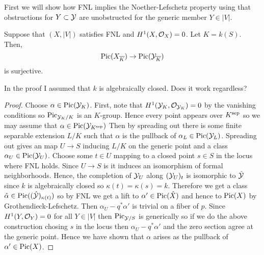 \documentclass[12pt]{article}
\begin{document}
First we will show how FNL implies the Noether-Lefschetz property using that obstructions for $Y \subset \mathcal{Y}$ are unobstructed for the generic member $Y \in |V|$.

\begin{theorem} \label{thm:FNL_implies_geometric_NL}
Suppose that $(X, |V|)$ satisfies FNL and $H^1(X, \mathcal{O}_{X}) = 0$. Let $K = k(S)$. Then,
\[ \mathrm{Pic}(X_{\overline{K}}) \to \mathrm{Pic}(\mathcal{Y}_{\overline{K}}) \]
is surjective.
\end{theorem}

{\color{red} In the proof I assumed that $k$ is algebraically closed. Does it work regardless?}

\begin{proof}
Choose $\alpha \in \mathrm{Pic}(\mathcal{Y}_K)$. First, note that $H^1(\mathcal{Y}_K, \mathcal{O}_{\mathcal{Y}_K}) = 0$ by the vanishing conditions so $\mathrm{Pic}_{\mathcal{Y}_K/K}$ is an \etale $K$-group. Hence every point appears over $K^{\mathrm{sep}}$ so we may assume that $\alpha \in \mathrm{Pic}(\mathcal{Y}_{K^{\mathrm{sep}}})$ Then by spreading out there is some finite separable extension $L/K$ such that $\alpha$ is the pullback of $\alpha_L \in \mathrm{Pic}(\mathcal{Y}_L)$. Spreading out gives an \etale map $U \to S$ inducing $L/K$ on the generic point and a class $\alpha_U \in \mathrm{Pic}(\mathcal{Y}_U)$. Choose some $t \in U$ mapping to a closed point $s \in S$ in the locus where FNL holds. Since $U \to S$ is \etale it induces an isomorphism of formal neighborhoods. Hence, the completion of $\mathcal{Y}_U$ along $(\mathcal{Y}_U)_t$ is isomorphic to $\hat{\mathcal{Y}}$ since $k$ is algebraically closed so $\kappa(t) = \kappa(s) = k$. Therefore we get a class $\hat{\alpha} \in \mathrm{Pic}((\hat{\mathcal{Y}})_{\kappa(t)})$ so by FNL we get a lift to $\alpha' \in \mathrm{Pic}(\hat{X})$ and hence to $\mathrm{Pic}(X)$ by Grothendieck-Lefschetz. Then $\alpha_U - q^* \alpha'$ is trivial on a fiber of $p$. Since $H^1(Y, \mathcal{O}_{Y}) = 0$ for all $Y \in |V|$ then $\mathrm{Pic}_{\mathcal{Y}/S}$ is generically \etale so if we do the above construction chosing $s$ in the \etale locus then $\alpha_U - q^* \alpha'$ and the zero section agree at the generic point. Hence we have shown that $\alpha$ arises as the pullback of $\alpha' \in \mathrm{Pic}(X)$.
\end{proof}
\end{document}
